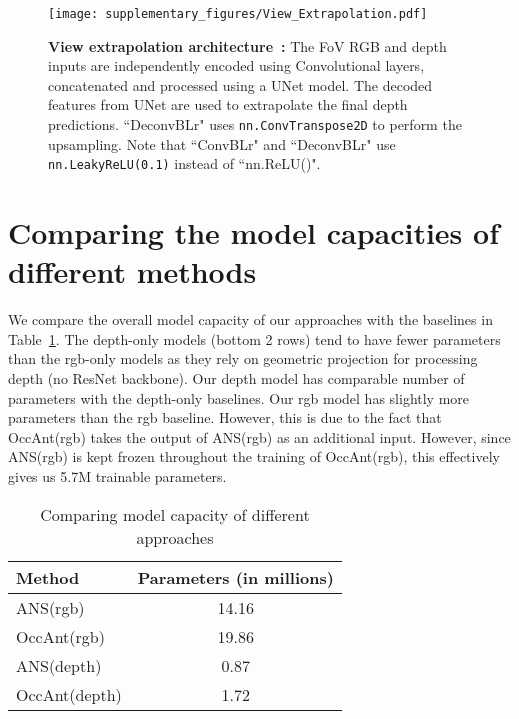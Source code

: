 \documentclass[runningheads]{llncs}
\newcommand{\code}[1]{\texttt{\small #1}}
\begin{document}
\begin{figure}[ht!]
    \centering
    \texttt{[image: supplementary\_figures/View\_Extrapolation.pdf]}
    \caption{\small \textbf{View extrapolation architecture~\cite{Yang_2019_CVPR}:} The  FoV RGB and depth inputs are independently encoded using Convolutional layers, concatenated and processed using a UNet model. The decoded features from UNet are used to extrapolate the final depth predictions. ``DeconvBLr" uses \code{nn.ConvTranspose2D} to perform the upsampling. Note that ``ConvBLr" and ``DeconvBLr" use \code{nn.LeakyReLU(0.1)} instead of ``nn.ReLU()". }
    \label{fig:view_extrapolation_architecture}
\end{figure}


\section{Comparing the model capacities of different methods}
\label{sec:model_capacity_comparison}

We compare the overall model capacity of our approaches with the baselines in Table~\ref{tab:model_capacity_comparison}. The depth-only models (bottom 2 rows) tend to have fewer parameters than the rgb-only models as they rely on geometric projection for processing depth (no ResNet backbone). Our depth model has comparable number of parameters with the depth-only baselines. Our rgb model has slightly more parameters than the rgb baseline. However, this is due to the fact that OccAnt(rgb) takes the output of ANS(rgb) as an additional input. However, since ANS(rgb) is kept frozen throughout the training of OccAnt(rgb), this effectively gives us 5.7M trainable parameters. 

\begin{table}[!]
    \centering
    \begin{tabular}{@{}lc@{}}
    \toprule
    Method        & Parameters (in millions) \\ \midrule
    ANS(rgb)      & 14.16                   \\
    OccAnt(rgb)   & 19.86                   \\ \midrule
    ANS(depth)    & 0.87                    \\
    OccAnt(depth) & 1.72                    \\\bottomrule
    \end{tabular}
    \caption{Comparing model capacity of different approaches}
    \label{tab:model_capacity_comparison}
\end{table}
\end{document}
